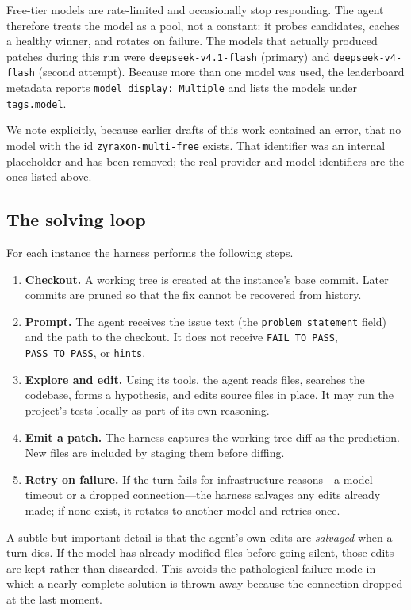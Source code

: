 \documentclass[11pt,a4paper]{article}
\begin{document}
Free-tier models are rate-limited and occasionally stop responding. The agent therefore
treats the model as a pool, not a constant: it probes candidates, caches a healthy
winner, and rotates on failure. The models that actually produced patches during this run were
\texttt{deepseek-v4.1-flash} (primary) and \texttt{deepseek-v4-flash} (second attempt). Because more than one model was used, the leaderboard
metadata reports \texttt{model\_display: Multiple} and lists the models under
\texttt{tags.model}.

We note explicitly, because earlier drafts of this work contained an error, that no
model with the id \texttt{zyraxon-multi-free} exists. That identifier was an internal
placeholder and has been removed; the real provider and model identifiers are the ones
listed above.

\subsection{The solving loop}

For each instance the harness performs the following steps.

\begin{enumerate}[leftmargin=1.4em]
  \item \textbf{Checkout.} A working tree is created at the instance's base commit.
  Later commits are pruned so that the fix cannot be recovered from history.
  \item \textbf{Prompt.} The agent receives the issue text (the \texttt{problem\_statement}
  field) and the path to the checkout. It does not receive \texttt{FAIL\_TO\_PASS},
  \texttt{PASS\_TO\_PASS}, or \texttt{hints}.
  \item \textbf{Explore and edit.} Using its tools, the agent reads files, searches the
  codebase, forms a hypothesis, and edits source files in place. It may run the project's
  tests locally as part of its own reasoning.
  \item \textbf{Emit a patch.} The harness captures the working-tree diff as the
  prediction. New files are included by staging them before diffing.
  \item \textbf{Retry on failure.} If the turn fails for infrastructure reasons---a model
  timeout or a dropped connection---the harness salvages any edits already made; if none
  exist, it rotates to another model and retries once.
\end{enumerate}

A subtle but important detail is that the agent's own edits are \emph{salvaged} when a
turn dies. If the model has already modified files before going silent, those edits are
kept rather than discarded. This avoids the pathological failure mode in which a nearly
complete solution is thrown away because the connection dropped at the last moment.
\end{document}
